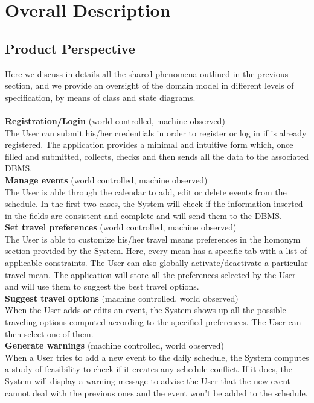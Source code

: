 \section{Overall Description}

\subsection{Product Perspective}
Here we discuss in details all the shared phenomena outlined in the previous section, and we provide an oversight of the domain model in different levels of specification, by means of class and state diagrams. \\ \\
\noindent
\textbf{Registration/Login} (world controlled, machine observed)\\
The User can submit his/her credentials in order to register or log in if is already registered. The application provides a minimal and intuitive form which, once filled and submitted, collects, checks and then sends all the data to the associated DBMS. \\ 

\noindent
\textbf{Manage events} (world controlled, machine observed)\\
The User is able through the calendar to add, edit or delete events from the schedule. In the first two cases, the System will check if the information inserted in the fields are consistent and complete and will send them to the DBMS.  \\

\noindent
\textbf{Set travel preferences} (world controlled, machine observed)\\
The User is able to customize his/her travel means preferences in the homonym section provided by the System. Here, every mean has a specific tab with a list of applicable constraints. The User can also globally activate/deactivate a particular travel mean. The application will store all the preferences selected by the User and will use them to suggest the best travel options.  \\

\noindent
\textbf{Suggest travel options} (machine controlled, world observed)\\
When the User adds or edits an event, the System shows up all the possible traveling options computed according to the specified preferences. The User can then select one of them. \\

\noindent
\textbf{Generate warnings} (machine controlled, world observed)\\
When a User tries to add a new event to the daily schedule, the System computes a study of feasibility to check if it creates any schedule conflict. If it does, the System will display a warning message to advise the User that the new event cannot deal with the previous ones and the event won't be added to the schedule. \\

